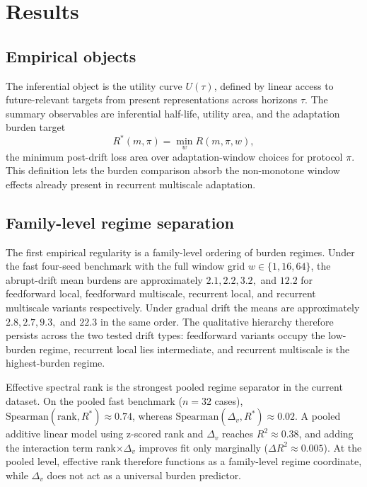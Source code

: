 \section{Results}

\subsection*{Empirical objects}

The inferential object is the utility curve $U(\tau)$, defined by linear access
to future-relevant targets from present representations across horizons
$\tau$. The summary observables are inferential half-life, utility area, and
the adaptation burden target
\[
  R^*(m,\pi) = \min_w R(m,\pi,w),
\]
the minimum post-drift loss area over adaptation-window choices for protocol
$\pi$. This definition lets the burden comparison absorb the non-monotone window
effects already present in recurrent multiscale adaptation.

\subsection*{Family-level regime separation}

The first empirical regularity is a family-level ordering of burden regimes.
Under the fast four-seed benchmark with the full window grid
$w \in \{1,16,64\}$, the abrupt-drift mean burdens are approximately
$2.1, 2.2, 3.2,$ and $12.2$ for feedforward local, feedforward multiscale,
recurrent local, and recurrent multiscale variants respectively. Under gradual
drift the means are approximately $2.8, 2.7, 9.3,$ and $22.3$ in the same
order. The qualitative hierarchy therefore persists across the two tested drift
types: feedforward variants occupy the low-burden regime, recurrent local lies
intermediate, and recurrent multiscale is the highest-burden regime.

Effective spectral rank is the strongest pooled regime separator in the current
dataset. On the pooled fast benchmark ($n=32$ cases),
$\mathrm{Spearman}(\mathrm{rank},R^*) \approx 0.74$, whereas
$\mathrm{Spearman}(\Delta_v,R^*) \approx 0.02$. A pooled additive linear model
using z-scored rank and $\Delta_v$ reaches $R^2 \approx 0.38$, and adding the
interaction term rank$\times\Delta_v$ improves fit only marginally
($\Delta R^2 \approx 0.005$). At the pooled level, effective rank therefore
functions as a family-level regime coordinate, while $\Delta_v$ does not act as
a universal burden predictor.

